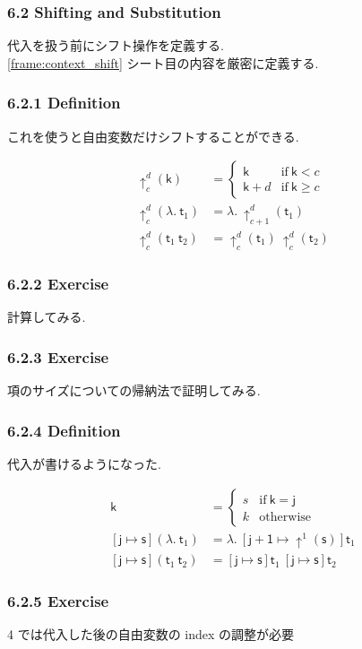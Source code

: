 \documentclass[13pt,dvipdfm]{beamer}
\begin{document}
\frame
{
  \frametitle{6.2 Shifting and Substitution}
  代入を扱う前にシフト操作を定義する.\\
  \ref{frame:context_shift} シート目の内容を厳密に定義する.
}

\frame
{
  \frametitle{6.2.1 Definition}
  これを使うと自由変数だけシフトすることができる.
  \begin{definition}
    \begin{align*}
      \uparrow^d_c (\mathsf{k}) &=
      \begin{cases}
        \mathsf{k} & \text{if}\ \mathsf{k} < c \\
        \mathsf{k} + d & \text{if}\ \mathsf{k} \geq c
      \end{cases} \\
      \uparrow^d_c (\lambda.\ \mathsf{t}_1) &= \lambda.\ \uparrow^d_{c+1} (\mathsf{t}_1) \\
      \uparrow^d_c (\mathsf{t}_1\ \mathsf{t}_2) &= \uparrow^d_c (\mathsf{t}_1)\  \uparrow^d_c(\mathsf{t}_2)
    \end{align*}
  \end{definition}
}

\frame
{
  \frametitle{6.2.2 Exercise}
  計算してみる.
}

\frame
{
  \frametitle{6.2.3 Exercise}
  項のサイズについての帰納法で証明してみる.
}

\frame
{
  \frametitle{6.2.4 Definition}
  代入が書けるようになった. \\

  \begin{definition}
    \begin{align*}
      [\mathsf{j} \mapsto \mathsf{s}]\mathsf{k} &=
      \begin{cases}
        s & \text{if}\ \mathsf{k} = \mathsf{j} \\
        k & \text{otherwise}
      \end{cases} \\
      [\mathsf{j} \mapsto \mathsf{s}](\lambda.\ \mathsf{t}_1) &=
      \lambda.\ [\mathsf{j+1} \mapsto \uparrow^{1} (\mathsf{s})]\mathsf{t}_1 \\
      [\mathsf{j} \mapsto \mathsf{s}](\mathsf{t}_1\ \mathsf{t}_2) &=
      [\mathsf{j} \mapsto \mathsf{s}]\mathsf{t}_1\ [\mathsf{j} \mapsto \mathsf{s}]\mathsf{t}_2
    \end{align*}
  \end{definition}
}

\frame
{
  \frametitle{6.2.5 Exercise}

  4 では代入した後の自由変数の index の調整が必要
}
\end{document}
